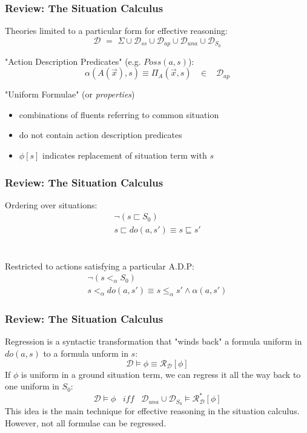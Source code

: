 \documentclass[compress]{beamer}
\begin{document}
\begin{frame}
\frametitle{Review: The Situation Calculus}
Theories limited to a particular form for effective reasoning:
\begin{equation*}
\mathcal{D}\,\,=\,\,\Sigma\cup\mathcal{D}_{ss}\cup\mathcal{D}_{ap}\cup\mathcal{D}_{una}\cup\mathcal{D}_{S_0}
\end{equation*}

"Action Description Predicates" (e.g. $Poss(a,s)$):
\begin{equation*}
\alpha(A(\overrightarrow{x}),s) \equiv \Pi_A(\overrightarrow{x},s)\,\,\,\,\,\in\,\,\,\,\,\mathcal{D}_{ap}
\end{equation*}

"Uniform Formulae" (or \emph{properties})
\begin{itemize}
 \item combinations of fluents referring to common situation
 \item do not contain action description predicates
 \item $\phi[s]$ indicates replacement of situation term with $s$
\end{itemize}

\end{frame}

\begin{frame}
\frametitle{Review: The Situation Calculus}
Ordering over situations:
\begin{gather*}
\neg\left(s \sqsubset S_0\right)\\
s\sqsubset do(a,s')\equiv s\sqsubseteq s'
\end{gather*}
\ \\
\ \\
Restricted to actions satisfying a particular A.D.P:
\begin{gather*}
\neg\left(s <_{\alpha} S_0\right)\\
s <_{\alpha} do(a,s')\equiv s \leq_{\alpha} s' \wedge \alpha(a,s')
\end{gather*}

\end{frame}

\begin{frame}
\frametitle{Review: The Situation Calculus}
Regression is a syntactic transformation that "winds back" a formula
uniform in $do(a,s)$ to a formula unform in $s$:
\begin{equation*}
\mathcal{D} \models \phi \equiv \mathcal{R}_{\mathcal{D}}[\phi]
\end{equation*}
If $\phi$ is uniform in a ground situation term, we can regress it all the
way back to one uniform in $S_0$:
\begin{equation*}
\mathcal{D} \models \phi\,\,\,\,\,\mathit{iff}\,\,\,\,\,\mathcal{D}_{una}\cup\mathcal{D}_{S_0} \models \mathcal{R}^*_{\mathcal{D}}[\phi]
\end{equation*}
This idea is the main technique for effective reasoning in the situation calculus. However, not all formulae can be regressed.
\end{frame}
\end{document}
